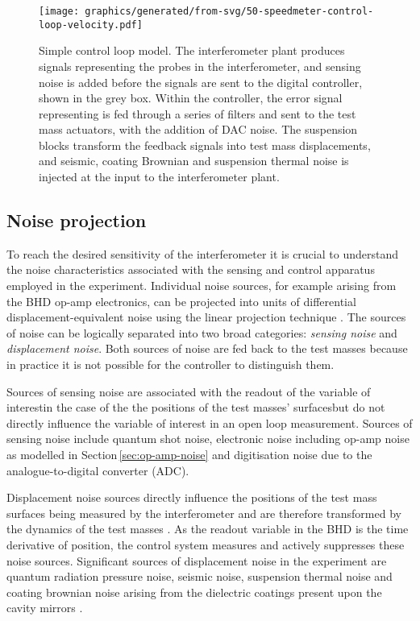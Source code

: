 \begin{figure}
  \texttt{[image: graphics/generated/from-svg/50-speedmeter-control-loop-velocity.pdf]}
  \caption[Modelled \SSMEXPT{} control loop using velocity feedback]{\label{fig:ssm-control-loop-velocity}Simple \SSM{} control loop model. The interferometer plant produces signals representing the probes in the interferometer, and sensing noise is added before the signals are sent to the digital controller, shown in the grey box. Within the controller, the error signal representing \LMINUS{} is fed through a series of filters and sent to the test mass actuators, with the addition of \gls{DAC} noise. The suspension blocks transform the feedback signals into test mass displacements, and seismic, coating Brownian and suspension thermal noise is injected at the input to the interferometer plant. }
\end{figure}

\subsection{Noise projection}

To reach the desired sensitivity of the interferometer it is crucial to understand the noise characteristics associated with the sensing and control apparatus employed in the experiment. Individual noise sources, for example arising from the \gls{BHD} op-amp electronics, can be projected into units of differential displacement-equivalent noise using the linear projection technique \cite{Smith2006}. The sources of noise can be logically separated into two broad categories: \emph{sensing noise} and \emph{displacement noise}. Both sources of noise are fed back to the test masses because in practice it is not possible for the controller to distinguish them.

Sources of sensing noise are associated with the readout of the variable of interest\textemdash in the case of the \SSM{} the positions of the test masses' surfaces\textemdash but do not directly influence the variable of interest in an open loop measurement. Sources of sensing noise include quantum shot noise, electronic noise including op-amp noise as modelled in Section\,\ref{sec:op-amp-noise} and digitisation noise due to the analogue-to-digital converter (\gls{ADC}).

Displacement noise sources directly influence the positions of the test mass surfaces being measured by the interferometer and are therefore transformed by the dynamics of the test masses \cite{Danilishin2015}. As the readout variable in the \gls{BHD} is the time derivative of position, the control system measures and actively suppresses these noise sources. Significant sources of displacement noise in the \SSM{} experiment are quantum radiation pressure noise, seismic noise, suspension thermal noise \cite{Hammond2012} and coating brownian noise arising from the dielectric coatings present upon the cavity mirrors \cite{Harry2002}.

